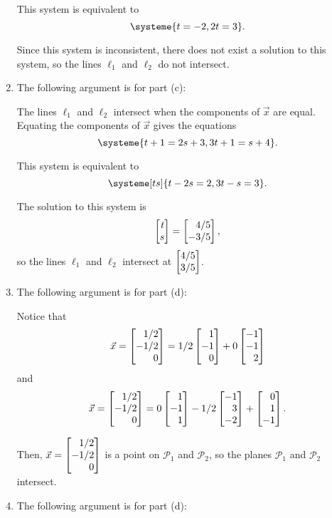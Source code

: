 \begin{exercises}
\begin{problist}
\begin{enumerate}
			This system is equivalent to
			\[
				\systeme{t=-2,2t=3}.
			\]
			
			Since this system is inconsistent, there does not exist a solution
			to this system, so the lines $\ell_{1}$ and $\ell_{2}$ do not
			intersect.
			
			\item The following argument is for part (c):
			
			The lines $\ell_{1}$ and $\ell_{2}$ intersect when the components
			of $\vec x$ are equal. Equating the components of $\vec x$ gives
			the equations
			\[
				\systeme{t+1=2s+3,3t+1=s+4}.
			\]
			
			This system is equivalent to
			\[
				\systeme[ts]{t-2s=2,3t-s=3}.
			\]
			
			The solution to this system is
			\[
				\mat{t\\s}=\mat{4/5\\-3/5},
			\]
			so the lines $\ell_1$ and $\ell_2$ intersect at $\mat{4/5\\3/5}$.
			\item The following argument is for part (d):
			
			Notice that
			\[
				\vec x=\mat{1/2\\-1/2\\0}=1/2\mat{1\\-1\\0}+0\mat{-1\\-1\\2}
			\]
			and
			\[
				\vec x=\mat{1/2\\-1/2\\0}=0\mat{1\\-1\\1}-1/2\mat{-1\\3\\-2}+\mat{0\\1\\-1}.
			\]
			
			Then, $\vec x=\mat{1/2\\-1/2\\0}$ is a point on $\mathcal{P}_{1}$
			and $\mathcal{P}_{2}$, so the planes $\mathcal{P}_{1}$ and
			$\mathcal{P}_{2}$ intersect.
			
			\item The following argument is for part (d):
			

\end{enumerate}
\end{problist}
\end{exercises}
